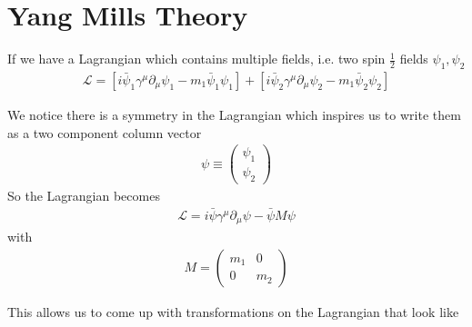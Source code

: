 \section{Yang Mills Theory}
If we have a Lagrangian which contains multiple fields, i.e. two spin $\frac{1}{2}$ fields $\psi_1, \psi_2$ \cite{griffiths_ep}
\begin{align}
\mathcal{L} = [i\bar{\psi}_1\gamma^\mu\partial_\mu\psi_1 - m_1\bar{\psi}_1\psi_1] + [i\bar{\psi}_2\gamma^\mu\partial_\mu\psi_2 - m_1\bar{\psi}_2\psi_2]
\end{align}

We notice there is a symmetry in the Lagrangian which inspires us to write them as a two component column vector
\begin{align}
\psi \equiv \begin{pmatrix}
\psi_1\\
\psi_2
\end{pmatrix}
\end{align}
So the Lagrangian becomes
\begin{align}
\mathcal{L} = i\bar{\psi}\gamma^\mu\partial_\mu\psi - \bar{\psi}M\psi
\end{align}
with
\begin{align}
M = \begin{pmatrix}
m_1 & 0\\
0 & m_2
\end{pmatrix}
\end{align}

This allows us to come up with transformations on the Lagrangian that look like

